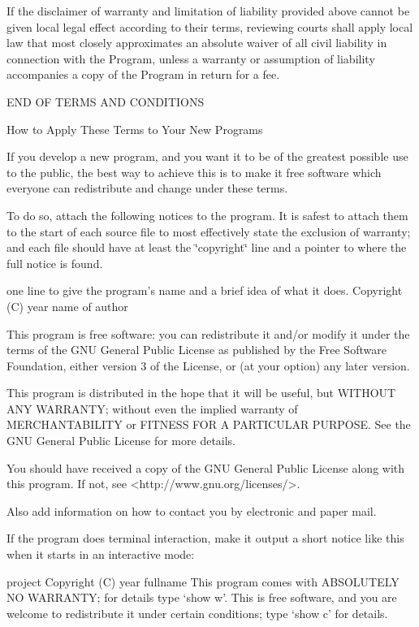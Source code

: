 If the disclaimer of warranty and limitation of liability provided above cannot be given local legal effect according to their terms, reviewing courts shall apply local law that most closely approximates an absolute waiver of all civil liability in connection with the Program, unless a warranty or assumption of liability accompanies a copy of the Program in return for a fee. \begin{DoxyVerb}                 END OF TERMS AND CONDITIONS

        How to Apply These Terms to Your New Programs
\end{DoxyVerb}


If you develop a new program, and you want it to be of the greatest possible use to the public, the best way to achieve this is to make it free software which everyone can redistribute and change under these terms.

To do so, attach the following notices to the program. It is safest to attach them to the start of each source file to most effectively state the exclusion of warranty; and each file should have at least the \char`\"{}copyright\char`\"{} line and a pointer to where the full notice is found. \begin{DoxyVerb}{one line to give the program's name and a brief idea of what it does.}
Copyright (C) {year}  {name of author}

This program is free software: you can redistribute it and/or modify
it under the terms of the GNU General Public License as published by
the Free Software Foundation, either version 3 of the License, or
(at your option) any later version.

This program is distributed in the hope that it will be useful,
but WITHOUT ANY WARRANTY; without even the implied warranty of
MERCHANTABILITY or FITNESS FOR A PARTICULAR PURPOSE.  See the
GNU General Public License for more details.

You should have received a copy of the GNU General Public License
along with this program.  If not, see <http://www.gnu.org/licenses/>.
\end{DoxyVerb}


Also add information on how to contact you by electronic and paper mail.

If the program does terminal interaction, make it output a short notice like this when it starts in an interactive mode\+: \begin{DoxyVerb}{project}  Copyright (C) {year}  {fullname}
This program comes with ABSOLUTELY NO WARRANTY; for details type `show w'.
This is free software, and you are welcome to redistribute it
under certain conditions; type `show c' for details.
\end{DoxyVerb}


